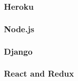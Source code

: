 \subsubsection{Heroku}


\subsubsection{Node.js}


\subsubsection{Django}


\subsubsection{React and Redux}


% 